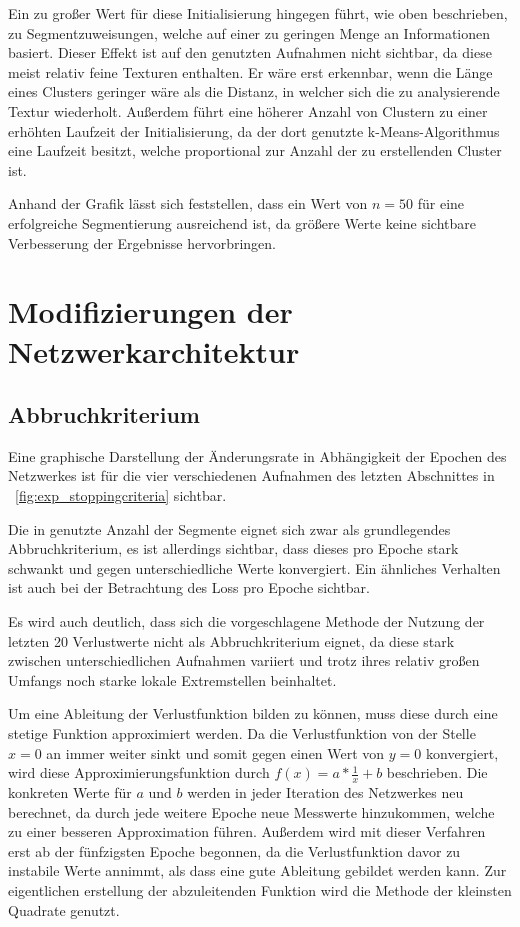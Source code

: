 Ein zu großer Wert für diese Initialisierung hingegen führt, wie oben beschrieben, zu Segmentzuweisungen, welche auf einer zu geringen Menge an Informationen basiert. Dieser Effekt ist auf den genutzten Aufnahmen nicht sichtbar, da diese meist relativ feine Texturen enthalten. Er wäre erst erkennbar, wenn die Länge eines Clusters geringer wäre als die Distanz, in welcher sich die zu analysierende Textur wiederholt. Außerdem führt eine höherer Anzahl von Clustern zu einer erhöhten Laufzeit der Initialisierung, da der dort genutzte k-Means-Algorithmus eine Laufzeit besitzt, welche proportional zur Anzahl der zu erstellenden Cluster ist.

Anhand der Grafik lässt sich feststellen, dass ein Wert von $n=50$ für eine erfolgreiche Segmentierung ausreichend ist, da größere Werte keine sichtbare Verbesserung der Ergebnisse hervorbringen.

\section{Modifizierungen der Netzwerkarchitektur}

\subsection{Abbruchkriterium}
\label{ssec:exp_stoppingcriteria}

Eine graphische Darstellung der Änderungsrate in Abhängigkeit der Epochen des Netzwerkes ist für die vier verschiedenen Aufnahmen des letzten Abschnittes in \figurename~\ref{fig:exp_stoppingcriteria} sichtbar.

Die in \cite{kanezaki_18} genutzte Anzahl der Segmente eignet sich zwar als grundlegendes Abbruchkriterium, es ist allerdings sichtbar, dass dieses pro Epoche stark schwankt und gegen unterschiedliche Werte konvergiert. Ein ähnliches Verhalten ist auch bei der Betrachtung des Loss pro Epoche sichtbar.

Es wird auch deutlich, dass sich die vorgeschlagene Methode der Nutzung der letzten 20 Verlustwerte nicht als Abbruchkriterium eignet, da diese stark zwischen unterschiedlichen Aufnahmen variiert und trotz ihres relativ großen Umfangs noch starke lokale Extremstellen beinhaltet.

Um eine Ableitung der Verlustfunktion bilden zu können, muss diese durch eine stetige Funktion approximiert werden. Da die Verlustfunktion von der Stelle $x=0$ an immer weiter sinkt und somit gegen einen Wert von $y=0$ konvergiert, wird diese Approximierungsfunktion durch $f(x) = a*\frac{1}{x}+b$ beschrieben. Die konkreten Werte für $a$ und $b$ werden in jeder Iteration des Netzwerkes neu berechnet, da durch jede weitere Epoche neue Messwerte hinzukommen, welche zu einer besseren Approximation führen. Außerdem wird mit dieser Verfahren erst ab der fünfzigsten Epoche begonnen, da die Verlustfunktion davor zu instabile Werte annimmt, als dass eine gute Ableitung gebildet werden kann. Zur eigentlichen erstellung der abzuleitenden Funktion wird die Methode der kleinsten Quadrate genutzt.

